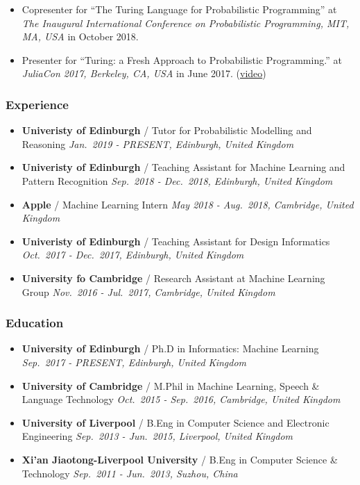 \documentclass[11pt, a4paper]{article}
\providecommand{\tightlist}{%
  \setlength{\itemsep}{0pt}\setlength{\parskip}{0pt}}
\begin{document}
\begin{raggedright}
\begin{itemize}
\tightlist
\item
  Copresenter for ``The Turing Language for Probabilistic Programming''
  at \emph{The Inaugural International Conference on Probabilistic
  Programming, MIT, MA, USA} in October 2018.
\item
  Presenter for ``Turing: a Fresh Approach to Probabilistic
  Programming.'' at \emph{JuliaCon 2017, Berkeley, CA, USA} in June
  2017. (\href{https://www.youtube.com/watch?v=DJWNQg7uuCg}{video})
\end{itemize}

\subsubsection{Experience}

\begin{itemize}
\tightlist
\item
  \textbf{Univeristy of Edinburgh} / Tutor for Probabilistic Modelling
  and Reasoning \emph{Jan.~2019 - PRESENT, Edinburgh, United Kingdom}
\item
  \textbf{Univeristy of Edinburgh} / Teaching Assistant for Machine
  Learning and Pattern Recognition \emph{Sep.~2018 - Dec.~2018,
  Edinburgh, United Kingdom}
\item
  \textbf{Apple} / Machine Learning Intern \emph{May 2018 - Aug.~2018,
  Cambridge, United Kingdom}
\item
  \textbf{Univeristy of Edinburgh} / Teaching Assistant for Design
  Informatics \emph{Oct.~2017 - Dec.~2017, Edinburgh, United Kingdom}
\item
  \textbf{University fo Cambridge} / Research Assistant at Machine
  Learning Group \emph{Nov.~2016 - Jul.~2017, Cambridge, United Kingdom}
\end{itemize}

\subsubsection{Education}

\begin{itemize}
\tightlist
\item
  \textbf{University of Edinburgh} / Ph.D in Informatics: Machine
  Learning \emph{Sep.~2017 - PRESENT, Edinburgh, United Kingdom}
\item
  \textbf{University of Cambridge} / M.Phil in Machine Learning, Speech
  \& Language Technology \emph{Oct.~2015 - Sep.~2016, Cambridge, United
  Kingdom}
\item
  \textbf{University of Liverpool} / B.Eng in Computer Science and
  Electronic Engineering \emph{Sep.~2013 - Jun.~2015, Liverpool, United
  Kingdom}
\item
  \textbf{Xi'an Jiaotong-Liverpool University} / B.Eng in Computer
  Science \& Technology \emph{Sep.~2011 - Jun.~2013, Suzhou, China}
\end{itemize}


\end{raggedright}
\end{document}
